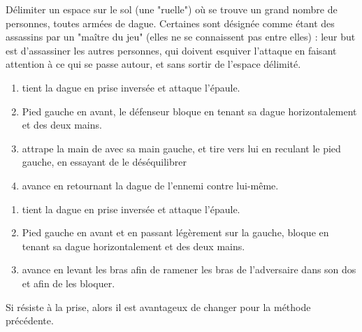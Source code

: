 \begin{exercice}

Délimiter un espace sur le sol (une "ruelle") où se trouve un grand nombre de personnes, toutes armées de dague.
Certaines sont désignée comme étant des assassins par un "maître du jeu" (elles ne se connaissent pas entre elles) : leur but est d'assassiner les autres personnes, qui doivent esquiver l'attaque en faisant attention à ce qui se passe autour, et sans sortir de l'espace délimité.
\end{exercice}


\begin{technique}

\begin{enumerate}
	\item \A tient la dague en prise inversée et attaque l'épaule.
	
	\item Pied gauche en avant, le défenseur bloque en tenant sa dague horizontalement et des deux mains.
	
	\item \D attrape la main de \A avec sa main gauche, et tire vers lui en reculant le pied gauche, en essayant de le déséquilibrer
	
	\item \D avance en retournant la dague de l'ennemi contre lui-même.
\end{enumerate}
\end{technique}


\begin{technique}

\begin{enumerate}
	\item \A tient la dague en prise inversée et attaque l'épaule.
	
	\item Pied gauche en avant et en passant légèrement sur la gauche, \D bloque en tenant sa dague horizontalement et des deux mains.
	
	\item \D avance en levant les bras afin de ramener les bras de l'adversaire dans son dos et afin de les bloquer.
\end{enumerate}

Si \A résiste à la prise, alors il est avantageux de changer pour la méthode précédente.
\end{technique}

